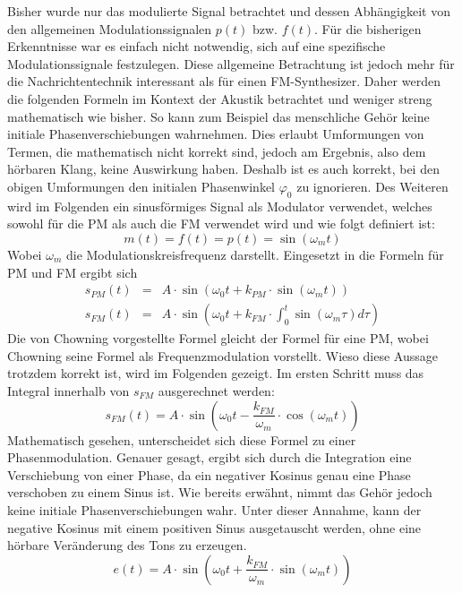 Bisher wurde nur das modulierte Signal betrachtet und dessen Abhängigkeit von den allgemeinen Modulationssignalen \(p(t)\) bzw. \(f(t)\). Für die bisherigen Erkenntnisse war es einfach nicht notwendig, sich auf eine spezifische Modulationssignale festzulegen. Diese allgemeine Betrachtung ist jedoch mehr für die Nachrichtentechnik interessant als für einen FM-Synthesizer.
Daher werden die folgenden Formeln im Kontext der Akustik betrachtet und weniger streng mathematisch wie bisher. So kann zum Beispiel das menschliche Gehör keine initiale Phasenverschiebungen wahrnehmen. Dies erlaubt Umformungen von Termen, die mathematisch nicht korrekt sind, jedoch am Ergebnis, also dem hörbaren Klang, keine Auswirkung haben. Deshalb ist es auch korrekt, bei den obigen Umformungen den initialen Phasenwinkel $\varphi_0$ zu ignorieren. Des Weiteren wird im Folgenden ein sinusförmiges Signal als Modulator verwendet, welches sowohl für die PM als auch die FM verwendet wird und wie folgt definiert ist:
\begin{equation}
m(t)=f(t)=p(t)=\sin(\omega_m t)
\end{equation}
Wobei \(\omega_m\) die Modulationskreisfrequenz darstellt. Eingesetzt in die Formeln für PM und FM ergibt sich
\begin{eqnarray*}
s_{PM}(t)&=&A\cdot\sin(\omega_0t+k_{PM}\cdot\sin(\omega_m t)) \\
s_{FM}(t)&=&A\cdot\sin(\omega_0t+k_{FM}\cdot\int_0^t{\sin(\omega_m \tau)} d\tau)
\end{eqnarray*}
Die von Chowning vorgestellte Formel gleicht der Formel für eine PM, \cite{chowningPaper} wobei Chowning seine Formel als Frequenzmodulation vorstellt. Wieso diese Aussage trotzdem korrekt ist, wird im Folgenden gezeigt. Im ersten Schritt muss das Integral innerhalb von \(s_{FM}\) ausgerechnet werden:
\begin{equation*}
s_{FM}(t)=A\cdot\sin(\omega_0t-\frac{k_{FM}}{\omega_m}\cdot\cos(\omega_m t))
\end{equation*}
Mathematisch gesehen, unterscheidet sich diese Formel zu einer Phasenmodulation. Genauer gesagt, ergibt sich durch die Integration eine Verschiebung von einer Phase, da ein negativer Kosinus genau eine Phase verschoben zu einem Sinus ist. Wie bereits erwähnt, nimmt das Gehör jedoch keine initiale Phasenverschiebungen wahr. Unter dieser Annahme, kann der negative Kosinus mit einem positiven Sinus ausgetauscht werden, ohne eine hörbare Veränderung des Tons zu erzeugen.
\begin{equation*}
e(t)=A\cdot\sin(\omega_0t+\frac{k_{FM}}{\omega_m}\cdot\sin(\omega_m t))
\end{equation*}
